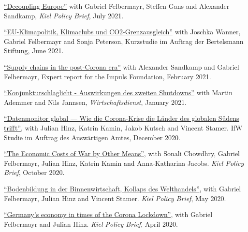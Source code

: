 \documentclass{article}
\begin{document}
\begin{minipage}[t]{0.8\textwidth}
    \href{https://www.ifw-kiel.de/publications/kiel-policy-briefs/2021/decoupling-europe-16271/}{``Decoupling Europe''} with Gabriel Felbermayr, Steffen Gans and Alexander Sandkamp, \textit{Kiel Policy Brief}, July 2021. \par
    \href{https://www.bertelsmann-stiftung.de/de/publikationen/publikation/did/eu-klimapolitik-klimaclubs-und-co2-grenzausgleich}{``EU-Klimapolitik, Klimaclubs und CO2-Grenzausgleich''} with Joschka Wanner, Gabriel Felbermayr and Sonja Peterson, Kurzstudie im Auftrag der Bertelsmann Stiftung, June 2021. \par
      \href{https://www.ifw-kiel.de/publications/policy-papers/2021/supply-chains-in-the-post-corona-era-in-german-15841/}{``Supply chains in the post-Corona era''} with Alexander Sandkamp and Gabriel Felbermayr, Expert report for the Impuls Foundation, February 2021. \par
    \href{https://www.wirtschaftsdienst.eu/inhalt/jahr/2021/heft/1/beitrag/auswirkungen-des-zweiten-shutdowns.html}{``Konjunkturschlaglicht - Auswirkungen des zweiten Shutdowns''} with Martin Ademmer and Nils Jannsen, \textit{Wirtschaftsdienst}, January 2021. \par
    \href{https://www.ifw-kiel.de/de/publikationen/policy-papers/2021/corona-krise-datenmonitor-global-0/}{``Datenmonitor global — Wie die Corona-Krise die Länder des globalen Südens trifft''}, with Julian Hinz, Katrin Kamin, Jakob Kutsch and Vincent Stamer. IfW Studie im Auftrag des Auswärtigen Amtes, December 2020. \par
    \href{https://www.ifw-kiel.de/publications/kiel-policy-briefs/2020/the-economic-costs-of-war-by-other-means-15301/}{``The Economic Costs of War by Other Means''}, with Sonali Chowdhry, Gabriel Felbermayr, Julian Hinz, Katrin Kamin and Anna-Katharina Jacobs. \textit{Kiel Policy Brief}, October 2020. \par
    \href{https://www.ifw-kiel.de/de/publikationen/kiel-policy-briefs/spezial/bodenbildung-in-der-binnenwirtschaft-kollaps-des-welthandels-14242/}{``Bodenbildung in der Binnenwirtschaft, Kollaps des Welthandels''}, with Gabriel Felbermayr, Julian Hinz and Vincent Stamer. \textit{Kiel Policy Brief}, May 2020. \par
    \href{https://www.ifw-kiel.de/publications/kiel-policy-briefs/special-edition/germanys-economy-in-times-of-the-corona-lockdown-14127/}{``Germany’s economy in times of the Corona Lockdown''}, with Gabriel Felbermayr and Julian Hinz. \textit{Kiel Policy Brief}, April 2020.
\end{minipage}
\medskip
\end{document}
